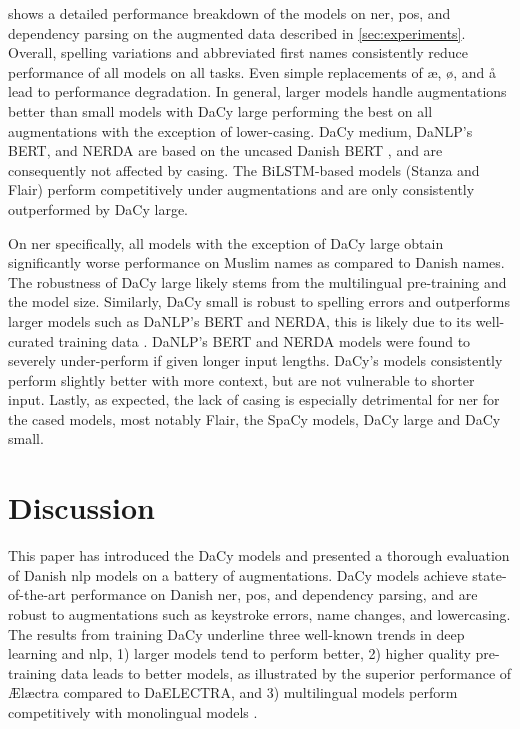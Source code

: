 \documentclass{article}
\begin{document}
 shows a detailed performance breakdown of the models on \gls{ner}, \gls{pos}, and dependency parsing on the augmented data described in \cref{sec:experiments}. Overall, spelling variations and abbreviated first names consistently reduce performance of all models on all tasks. Even simple replacements of æ, ø, and å lead to performance degradation. In general, larger models handle augmentations better than small models with DaCy large performing the best on all augmentations with the exception of lower-casing. DaCy medium, DaNLP's BERT, and NERDA are based on the uncased Danish BERT \parencite{mollerhoj_danish_2019}, and are consequently not affected by casing. The BiLSTM-based models (Stanza and Flair) perform competitively under augmentations and are only consistently outperformed by DaCy large. 

On \gls{ner} specifically, all models with the exception of DaCy large obtain significantly worse performance on Muslim names as compared to Danish names. The robustness of DaCy large likely stems from the multilingual pre-training and the model size. Similarly, DaCy small is robust to spelling errors and outperforms larger models such as DaNLP's BERT and NERDA, this is likely due to its well-curated training data \parencite{derczynski_danish_2021}. DaNLP's BERT and NERDA models were found to severely under-perform if given longer input lengths. DaCy's models consistently perform slightly better with more context, but are not vulnerable to shorter input. Lastly, as expected, the lack of casing is especially detrimental for \gls{ner} for the cased models, most notably Flair, the SpaCy models, DaCy large and DaCy small. 
 
\section{Discussion}
This paper has introduced the DaCy models and presented a thorough evaluation of Danish \gls{nlp} models on a battery of augmentations. DaCy models achieve state-of-the-art performance on Danish \gls{ner}, \gls{pos}, and dependency parsing, and are robust to augmentations such as keystroke errors, name changes, and lowercasing. The results from training DaCy underline three well-known trends in deep learning and \gls{nlp},
1) larger models tend to perform better, 2) higher quality pre-training data leads to better models, as illustrated by the superior performance of Ælæctra compared to DaELECTRA, and 3) multilingual models perform competitively with monolingual models \parencite{raffel_exploring_2020, xue_mt5_2021, brown_language_2020}.
\end{document}
